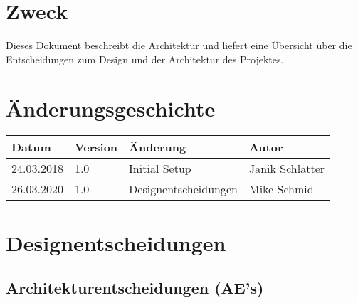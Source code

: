 \documentclass[
	ngerman,
	toc=listof, %
	toc=bibliography, %
	footnotes=multiple, %
	parskip=half, %
	numbers=noendperiod %
]{scrartcl}
\newcommand{\vorlagenOrdner}{../../99_Vorlagen} %
\begin{document}
\thispagestyle{plain}

\cleardoublepage


\section*{Zweck}
Dieses Dokument beschreibt die Architektur und liefert eine Übersicht über die Entscheidungen zum Design und der Architektur des Projektes.

\section*{Änderungsgeschichte}
\begin{tabularx}{\textwidth}{llXl}
	\toprule
	Datum & Version & Änderung & Autor \\
	\midrule
	24.03.2018 & 1.0 & Initial Setup & Janik Schlatter \\
	26.03.2020 & 1.0 & Designentscheidungen & Mike Schmid \\ 
	\bottomrule
\end{tabularx}
\cleardoublepage

{}
\tableofcontents
\cleardoublepage

\let\stdsection\section
\renewcommand\section{\clearpage\stdsection}

\section{Designentscheidungen}
	\subsection{Architekturentscheidungen (AE's)}
\end{document}
